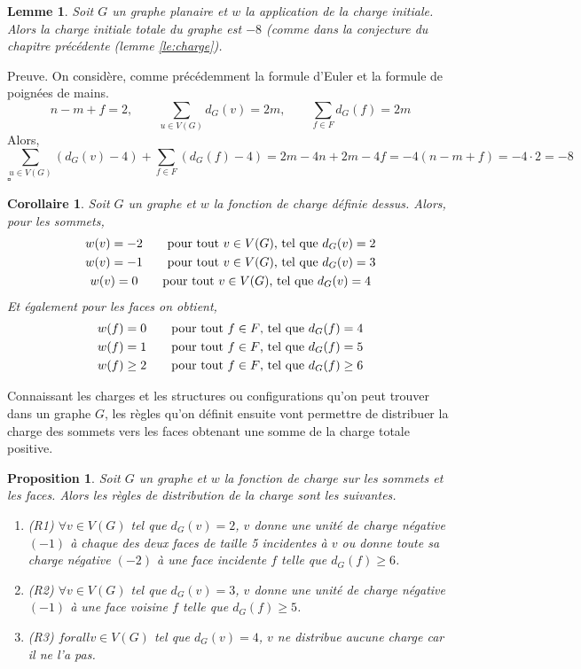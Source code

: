 \documentclass[10pt,a4paper]{article}
\newtheorem{proposition}{Proposition}
\newtheorem{lemme}{Lemme}
\newtheorem{corollaire}{Corollaire}
\newcommand{\ep}{{\hfill $\square$}}
\begin{document}
\begin{lemme}
Soit $G$ un graphe planaire et $w$ la application de la charge initiale. Alors la charge initiale totale du graphe est $-8$ (comme dans la conjecture du chapitre précédente (lemme \ref{le:charge}).
\end{lemme}

Preuve.
On considère, comme précédemment la formule d'Euler et la formule de poignées de mains.
$$
n - m + f = 2, \qquad \sum_{u \in V(G)} d_G(v) = 2m, \qquad \sum_{f \in F} d_G(f) = 2m
$$
Alors,
$$
\sum_{u \in V(G)} (d_G(v) - 4) + \sum_{f \in F} (d_G(f) - 4) = 2m - 4n + 2m - 4f = -4( n - m + f) = -4 \cdot 2 = -8
$$
\ep

\begin{corollaire}
Soit $G$ un graphe et $w$ la fonction de charge définie dessus. Alors, pour les sommets,
$$
\gathered
w(v) = -2 \qquad \textrm{pour tout $v \in V(G)$, tel que  } d_G(v) = 2\\
w(v) = -1 \qquad \textrm{pour tout $v \in V(G)$, tel que  } d_G(v) = 3\\
w(v) = 0 \qquad \textrm{pour tout $v \in V(G)$, tel que  } d_G(v) = 4
\endgathered
$$
Et également pour les faces on obtient,
$$
\gathered
w(f) = 0 \qquad \textrm{pour tout $f \in F$, tel que  } d_G(f) = 4\\
w(f) = 1 \qquad \textrm{pour tout $f \in F$, tel que  } d_G(f) = 5\\
w(f) \geq 2 \qquad \textrm{pour tout $f \in F$, tel que  } d_G(f) \geq 6
\endgathered
$$
\end{corollaire}

Connaissant les charges et les structures ou configurations qu'on peut trouver dans un graphe $G$, les règles qu'on définit ensuite vont permettre de distribuer la charge des sommets vers les faces obtenant une somme de la charge totale positive.

\begin{proposition}
Soit $G$ un graphe et $w$ la fonction de charge sur les sommets et les faces. Alors les règles de distribution de la charge sont les suivantes.
\begin{enumerate}
\item (R1) $\forall v \in V(G)$ tel que $d_G(v) = 2$, $v$ donne une unité de charge négative $(-1)$ à chaque des deux faces de taille 5 incidentes à $v$ ou donne toute sa charge négative $(-2)$ à une face incidente $f$ telle que $d_G(f) \geq 6$.
\item (R2) $\forall v \in V(G)$ tel que $d_G(v) = 3$, $v$ donne une unité de charge négative $(-1)$ à une face voisine $f$ telle que $d_G(f) \geq 5$.
\item (R3) $forall v \in V(G)$ tel que $d_G(v) = 4$, $v$ ne distribue aucune charge car il ne l'a pas.
\end{enumerate}
\end{proposition}
\end{document}
